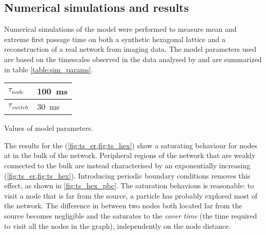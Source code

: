 \subsection{Numerical simulations and results}

Numerical simulations of the model were performed to measure mean and extreme first passage time on both a synthetic hexagonal lattice and a reconstruction of a real network from  imaging data. The model parameters used are based on the timescales observed in the  data analysed by \citeauthor{holcman2018single} and are summarized in table \ref{table:sim_params}.

\begin{margintable}
  \sffamily
  \vspace{1em}
  \begin{tabular*}{\textwidth}{@{}ll@{}}
    \hline
    $\tau_{node}$   & \SI{100}{\milli\second}  \\
    \hline
    $\tau_{switch}$ & \SI{30}{\milli\second}  \\
    \hline
  \end{tabular*}
  \caption{Values of model parameters.}\label{table:sim_params}
\end{margintable}

The results for the  (\cref{fig:ts_er,fig:ts_hex}) show a saturating behaviour for nodes at in the bulk of the network. Peripheral regions of the network that are weakly connected to the bulk are instead characterised by an exponentially increasing  (\cref{fig:ts_er,fig:ts_hex}). Introducing periodic boundary conditions removes this effect, as shown in \cref{fig:ts_hex_pbc}. The saturation behavious is reasonable: to visit a node that is far from the source, a particle has probably explored most of the network. The difference in  between two nodes both located far from the source becomes negligible and the  saturates to the \emph{cover time} (the time required to visit all the nodes in the graph), independently on the node distance.

